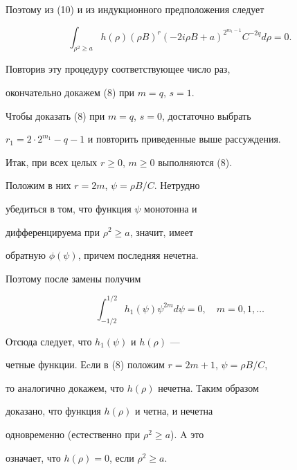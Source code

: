 \begin{pf}
Поэтому из (10) и из индукционного предположения следует 


$$


\int_{\rho^{2} \ge a} h(\rho) (\rho B)^{r} (-2i\rho B +a) ^{2^{m_{1}-


1}} C^{-2q} d\rho =0.


$$


Повторив эту процедуру соответствующее число раз, 


окончательно докажем (8) при $m=q$, $s=1$. 


Чтобы доказать (8) при $m=q$, $s=0$, достаточно выбрать


$r_1=2\cdot 2^{m_1}-q-1$ и повторить приведенные выше рассуждения.





Итак, при всех целых $r \ge 0$, $m \ge 0$ выполняются (8). 


Положим в них $r=2m$, $\psi =\rho B / C$. Нетрудно


убедиться в том, что функция $\psi$ монотонна и


дифференцируема при $\rho^{2} \ge a$, значит, имеет


обратную $\phi (\psi )$, причем последняя нечетна. 


Поэтому после замены получим


$$


\int_{-1/2}^{1/2} h_{1}(\psi) \psi^{2m} d\psi=0, 


\quad m=0, 1, \dotsc


$$


Отсюда следует, что $h_{1}(\psi)$ и $h(\rho)$ ---


четные функции. Еcли в (8) положим $r=2m+1$, $\psi=\rho B /C $, 


то аналогично докажем, что $h(\rho)$ нечетна. Таким образом


доказано, что функция $h(\rho)$ и четна, и нечетна


одновременно (естественно при $\rho^{2} \ge a$). A это


означает, что $h(\rho)=0$, если $\rho^{2} \ge a$.


\end{pf}









